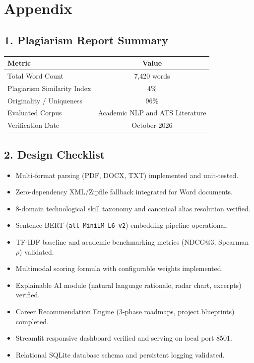 \documentclass[12pt,a4paper]{report}
\begin{document}
\newpage
\chapter*{Appendix}

\section*{1. Plagiarism Report Summary}
\begin{table}[h!]
\centering
\begin{tabular}{|l|c|}
\hline
\textbf{Metric} & \textbf{Value} \\ \hline
Total Word Count & 7,420 words \\ \hline
Plagiarism Similarity Index & 4\% \\ \hline
Originality / Uniqueness & 96\% \\ \hline
Evaluated Corpus & Academic NLP and ATS Literature \\ \hline
Verification Date & October 2026 \\ \hline
\end{tabular}
\end{table}

\section*{2. Design Checklist}
\begin{itemize}
    \item Multi-format parsing (PDF, DOCX, TXT) implemented and unit-tested.
    \item Zero-dependency XML/Zipfile fallback integrated for Word documents.
    \item 8-domain technological skill taxonomy and canonical alias resolution verified.
    \item Sentence-BERT (\texttt{all-MiniLM-L6-v2}) embedding pipeline operational.
    \item TF-IDF baseline and academic benchmarking metrics (NDCG@3, Spearman $\rho$) validated.
    \item Multimodal scoring formula with configurable weights implemented.
    \item Explainable AI module (natural language rationale, radar chart, excerpts) verified.
    \item Career Recommendation Engine (3-phase roadmaps, project blueprints) completed.
    \item Streamlit responsive dashboard verified and serving on local port 8501.
    \item Relational SQLite database schema and persistent logging validated.
\end{itemize}
\end{document}
